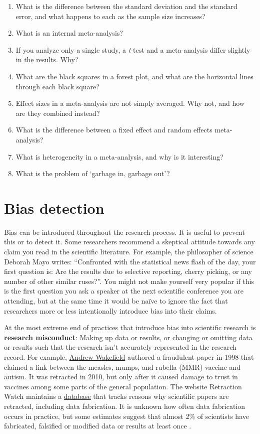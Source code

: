 \documentclass[
  oneside]{book}
\begin{document}
\begin{enumerate}
\def\labelenumi{\arabic{enumi}.}
\item
  What is the difference between the standard deviation and the standard error, and what happens to each as the sample size increases?
\item
  What is an internal meta-analysis?
\item
  If you analyze only a single study, a \emph{t}-test and a meta-analysis differ slightly in the results. Why?
\item
  What are the black squares in a forest plot, and what are the horizontal lines through each black square?
\item
  Effect sizes in a meta-analysis are not simply averaged. Why not, and how are they combined instead?
\item
  What is the difference between a fixed effect and random effects meta-analysis?
\item
  What is heterogeneity in a meta-analysis, and why is it interesting?
\item
  What is the problem of `garbage in, garbage out'?
\end{enumerate}

\hypertarget{bias}{%
\chapter{Bias detection}\label{bias}}

Bias can be introduced throughout the research process. It is useful to prevent this or to detect it. Some researchers recommend a skeptical attitude towards any claim you read in the scientific literature. For example, the philosopher of science Deborah Mayo \citeyearpar{mayo_statistical_2018} writes: ``Confronted with the statistical news flash of the day, your first question is: Are the results due to selective reporting, cherry picking, or any number of other similar ruses?''. You might not make yourself very popular if this is the first question you ask a speaker at the next scientific conference you are attending, but at the same time it would be naïve to ignore the fact that researchers more or less intentionally introduce bias into their claims.

At the most extreme end of practices that introduce bias into scientific research is \textbf{research misconduct}: Making up data or results, or changing or omitting data or results such that the research isn't accurately represented in the research record. For example, \href{https://en.wikipedia.org/wiki/Andrew_Wakefield}{Andrew Wakefield} authored a fraudulent paper in 1998 that claimed a link between the measles, mumps, and rubella (MMR) vaccine and autism. It was retracted in 2010, but only after it caused damage to trust in vaccines among some parts of the general population. The website Retraction Watch maintains a \href{http://retractiondatabase.org}{database} that tracks reasons why scientific papers are retracted, including data fabrication. It is unknown how often data fabrication occurs in practice, but some estimates suggest that almost 2\% of scientists have fabricated, falsified or modified data or results at least once \citep{fanelli_how_2009}.
\end{document}
